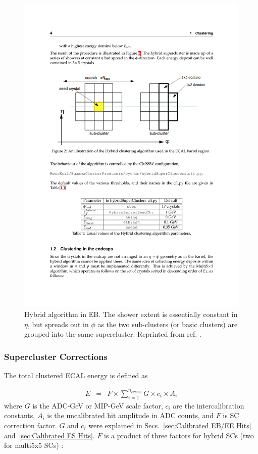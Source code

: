 \documentclass[dissertation.tex]{subfiles}
\begin{document}
\begin{figure}
	\centering
	\includegraphics[scale=0.5]{hybrid}
	\caption{Hybrid algorithm in EB.  The shower extent is essentially constant in $\eta$, but spreads out in $\phi$ as the two sub-clusters (or basic clusters) are grouped into the same supercluster.  Reprinted from ref. \cite{ECAL_SC_note}.}
	\label{fig:hybrid}
\end{figure}

\subsubsection{Supercluster Corrections}
\label{sec:Supercluster Corrections}

The total clustered ECAL energy is defined as

\begin{eqnarray}
E &=& F \times \sum_{i=1}^{n_{\mathrm{crystal}}} G \times c_{i} \times A_{i}
\end{eqnarray}
%
where $G$ is the ADC-GeV or MIP-GeV scale factor, $c_{i}$ are the intercalibration constants, $A_{i}$ is the uncalibrated hit amplitude in ADC counts, and $F$ is SC correction factor.  $G$ and $c_{i}$ were explained in Secs.~\ref{sec:Calibrated EB/EE Hits} and~\ref{sec:Calibrated ES Hits}.  $F$ is a product of three factors for hybrid SCs (two for multi5x5 SCs) \cite{ECAL_SC_note}:
\end{document}
